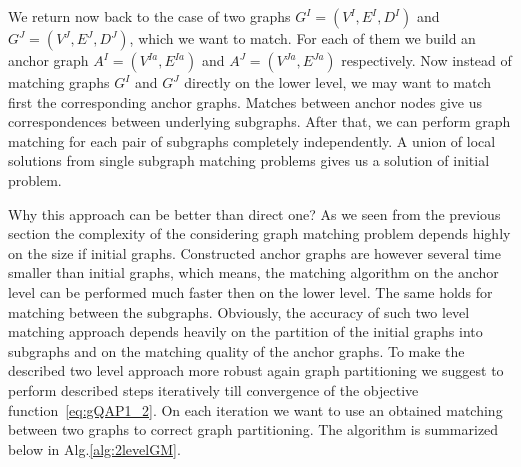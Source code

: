 We return now back to the case of two graphs $G^I=(V^I,E^I,D^I)$ and $G^J=(V^J,E^J,D^J)$, which we want to match. 
For each of them we build an anchor graph $A^I=(V^{Ia},E^{Ia})$ and $A^J=(V^{Ja},E^{Ja})$ respectively.
Now instead of matching graphs $G^I$ and $G^J$ directly on the lower level, we may want to match first the corresponding anchor graphs. Matches between anchor nodes give us correspondences between underlying subgraphs. After that, we can perform graph matching for each pair of subgraphs completely independently. A union of local solutions from single subgraph matching problems gives us a solution of initial problem. 

Why this approach can be better than direct one? As we seen from the previous section the complexity of the considering graph matching problem depends highly on the size if initial graphs. Constructed anchor graphs are however several time smaller than initial graphs, which means, the matching algorithm on the anchor level can be performed much faster then on the lower level. The same holds for matching between the subgraphs.
Obviously, the accuracy of such two level matching approach depends heavily on the partition of the initial graphs into subgraphs and on the matching quality of the anchor graphs. To make the described two level approach more robust again graph partitioning we suggest to perform described steps iteratively till convergence of the objective function~\eqref{eq:gQAP1_2}. On each iteration we want to use an obtained matching between two graphs to correct graph partitioning. The algorithm is summarized below in Alg.\ref{alg:2levelGM}.

